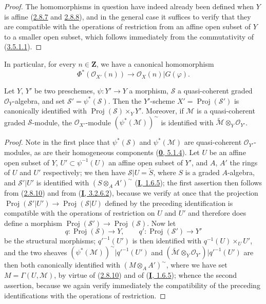 \begin{proof}
The homomorphisms in question have indeed already been defined when $Y$ is
affine (\hyperref[II.2.8.7]{2.8.7} and
\hyperref[II.2.8.8]{2.8.8}), and in the general case it suffices to verify
that they are compatible with the operations of restriction from an affine
open subset of $Y$ to a smaller open subset, which follows immediately from
the commutativity of (\hyperref[II.3.5.1.1]{3.5.1.1}).
\end{proof}

In particular, for every $n\in\mathbf{Z}$, we have a canonical homomorphism
\[
\label{II.3.5.2.1}
  \Phi^*(\mathcal{O}_{X'}(n))\longrightarrow
  \mathcal{O}_X(n)|G(\varphi).
\tag{3.5.2.1}
\]

\begin{proposition}[3.5.3]
\label{II.3.5.3}
Let $Y$, $Y'$ be two preschemes, $\psi:Y'\to Y$ a morphism,
$\mathcal{S}$ a quasi-coherent graded $\mathcal{O}_Y$-algebra, and set
$\mathcal{S}'=\psi^*(\mathcal{S})$. Then the $Y'$-scheme
$X'=\operatorname{Proj}(\mathcal{S}')$ is canonically identified with
$\operatorname{Proj}(\mathcal{S})\times_Y Y'$. Moreover, if $\mathcal{M}$ is
a quasi-coherent graded $\mathcal{S}$-module, the $\mathcal{O}_{X'}$-module
$(\psi^*(\mathcal{M}))^{\sim}$ is identified with
$\widetilde{\mathcal{M}}\otimes_Y\mathcal{O}_{Y'}$.
\end{proposition}

\begin{proof}
Note in the first place that $\psi^*(\mathcal{S})$ and
$\psi^*(\mathcal{M})$ are quasi-coherent $\mathcal{O}_{Y'}$-modules,
as are their homogeneous components
(\hyperref[0.5.1.4]{\textbf{0}, 5.1.4}). Let $U$ be an affine open subset of $Y$,
$U'\subset\psi^{-1}(U)$ an affine open subset of $Y'$, and $A$, $A'$ the rings
of $U$ and $U'$ respectively; we then have
$\mathcal{S}|U=\widetilde{S}$, where $S$ is a graded $A$-algebra, and
$\mathcal{S}'|U'$ is identified with $(S\otimes_A A')^{\sim}$
(\hyperref[I.1.6.5]{\textbf{I}, 1.6.5}); the first assertion then follows from
(\hyperref[II.2.8.10]{2.8.10}) and from
(\hyperref[I.3.2.6.2]{\textbf{I}, 3.2.6.2}), because we verify at once that the
projection
$\operatorname{Proj}(\mathcal{S}'|U')\to
\operatorname{Proj}(\mathcal{S}|U)$ defined by the preceding identification
is compatible with the operations of restriction on $U$ and $U'$ and
therefore does define a morphism
$\operatorname{Proj}(\mathcal{S}')\to\operatorname{Proj}(\mathcal{S})$.
Now let
\[
  q:\operatorname{Proj}(\mathcal{S})\to Y,
  \qquad q':\operatorname{Proj}(\mathcal{S}')\to Y'
\]
be the structural morphisms; $q'^{-1}(U')$ is then identified with
$q^{-1}(U)\times_U U'$, and the two sheaves
$(\psi^*(\mathcal{M}))^{\sim}|q'^{-1}(U')$ and
$(\widetilde{\mathcal{M}}\otimes_Y\mathcal{O}_{Y'})|q'^{-1}(U')$
are then both canonically identified with $(M\otimes_A A')^{\sim}$, where
we have set $M=\Gamma(U,\mathcal{M})$, by virtue of
(\hyperref[II.2.8.10]{2.8.10}) and of
(\hyperref[I.1.6.5]{\textbf{I}, 1.6.5}); whence the second assertion, because we
again verify immediately the compatibility of the preceding identifications
with the operations of restriction.
\end{proof}

